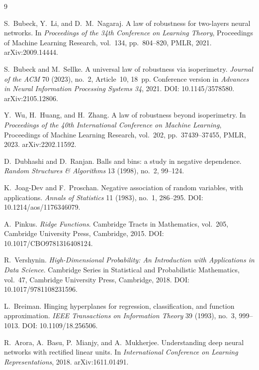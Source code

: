\documentclass[11pt,reqno]{amsart}
\theoremstyle{plain}
\theoremstyle{definition}
\theoremstyle{remark}
\begin{document}
\begin{thebibliography}{9}

S.~Bubeck, Y.~Li, and D.~M.~Nagaraj.
\newblock A law of robustness for two-layers neural networks.
\newblock In \emph{Proceedings of the 34th Conference on Learning Theory}, Proceedings of Machine Learning Research, vol.~134, pp.~804--820, PMLR, 2021. arXiv:2009.14444.

S.~Bubeck and M.~Sellke.
\newblock A universal law of robustness via isoperimetry.
\newblock \emph{Journal of the ACM} 70 (2023), no.~2, Article~10, 18~pp. Conference version in \emph{Advances in Neural Information Processing Systems 34}, 2021. DOI: 10.1145/3578580. arXiv:2105.12806.

Y.~Wu, H.~Huang, and H.~Zhang.
\newblock A law of robustness beyond isoperimetry.
\newblock In \emph{Proceedings of the 40th International Conference on Machine Learning}, Proceedings of Machine Learning Research, vol.~202, pp.~37439--37455, PMLR, 2023. arXiv:2202.11592.

D.~Dubhashi and D.~Ranjan.
\newblock Balls and bins: a study in negative dependence.
\newblock \emph{Random Structures \& Algorithms} 13 (1998), no.~2, 99--124.

K.~Joag-Dev and F.~Proschan.
\newblock Negative association of random variables, with applications.
\newblock \emph{Annals of Statistics} 11 (1983), no.~1, 286--295. DOI: 10.1214/aos/1176346079.

A.~Pinkus.
\newblock \emph{Ridge Functions}.
\newblock Cambridge Tracts in Mathematics, vol.~205, Cambridge University Press, Cambridge, 2015. DOI: 10.1017/CBO9781316408124.

R.~Vershynin.
\newblock \emph{High-Dimensional Probability: An Introduction with Applications in Data Science}.
\newblock Cambridge Series in Statistical and Probabilistic Mathematics, vol.~47, Cambridge University Press, Cambridge, 2018. DOI: 10.1017/9781108231596.

L.~Breiman.
\newblock Hinging hyperplanes for regression, classification, and function approximation.
\newblock \emph{IEEE Transactions on Information Theory} 39 (1993), no.~3, 999--1013. DOI: 10.1109/18.256506.

R.~Arora, A.~Basu, P.~Mianjy, and A.~Mukherjee.
\newblock Understanding deep neural networks with rectified linear units.
\newblock In \emph{International Conference on Learning Representations}, 2018. arXiv:1611.01491.


\end{thebibliography}
\end{document}

